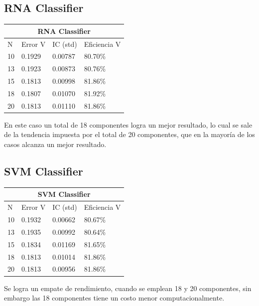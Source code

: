 \documentclass[conference]{IEEEtran}
\begin{document}
\subsection{RNA Classifier}\hfill

\begin{table}[h]
\centering
\begin{tabular}{llll}
\hline
\multicolumn{4}{c}{\textbf{RNA Classifier}} \\ \hline
N & Error V & IC (std) & Eficiencia V \\ \hline
10 & 0.1929 & 0.00787 & 80.70\% \\
13 & 0.1923 & 0.00873 & 80.76\% \\
15 & 0.1813 & 0.00998 & 81.86\% \\
18 & 0.1807 & 0.01070 & 81.92\% \\
20 & 0.1813 & 0.01110 & 81.86\% \\\hline
\end{tabular}
\end{table}\hfill
\newline
En este caso un total de 18 componentes logra un mejor resultado, lo cual se sale de la tendencia impuesta por el total de 20 componentes, que en la mayoría de los casos alcanza un mejor resultado.
\subsection{SVM Classifier}\hfill

\begin{table}[H]
\centering
\begin{tabular}{llll}
\hline
\multicolumn{4}{c}{\textbf{SVM Classifier}} \\ \hline
N & Error V & IC (std) & Eficiencia V \\ \hline
10 & 0.1932 & 0.00662 & 80.67\% \\
13 & 0.1935 & 0.00992 & 80.64\% \\
15 & 0.1834 & 0.01169 & 81.65\% \\
18 & 0.1813 & 0.01014 & 81.86\% \\
20 & 0.1813 & 0.00956 & 81.86\% \\\hline
\end{tabular}
\end{table}\hfill
\newline
Se logra un empate de rendimiento, cuando se emplean 18 y 20 componentes, sin embargo las 18 componentes tiene un costo menor computacionalmente.
\end{document}
